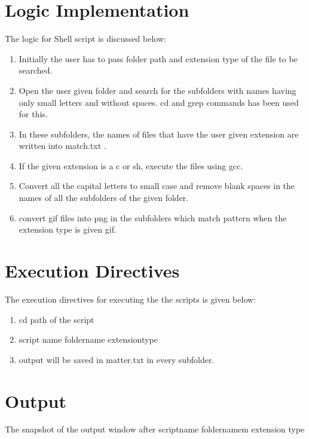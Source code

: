 \documentclass [12 pt ]{article}
\begin{document}
\section{Logic Implementation}
 The logic for Shell script is discussed below:
 
\begin{enumerate}
\item Initially the user has to pass folder path and extension type of the file to be searched. 
\item Open the user given folder and search for the subfolders with names having only small letters and without
spaces. cd and grep commands has been used for this.
\item In these subfolders, the names of files that have the user given extension are written into match.txt .
\item If the given extension is a c or sh, execute the files using gcc.
\item Convert all the capital letters to small case and remove blank spaces in the names of all the subfolders
of the given folder.
\item convert gif files into png in the subfolders which match pattern when the extension type is given gif.

  \end{enumerate}
 
 \newpage
 \section{Execution Directives}
 
 The execution directives for executing the the scripts is given below:
  \begin{enumerate} 
 
 \item cd path of the  script 
 \item script name foldername extensiontype
 \item output will be saved in matter.txt in every subfolder.

 
  
  \end{enumerate}

 \newpage
 
 \section{Output}
 The snapshot of the output window after scriptname foldernamem extension type
  
\end{document}
